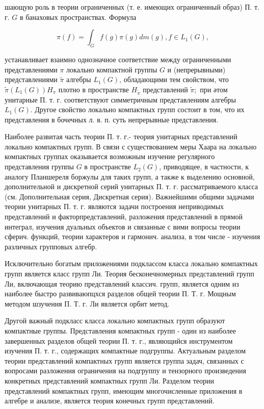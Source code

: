 \documentclass[10pt]{article}
\begin{document}
шающую роль в теории ограниченных (т. е. имеющих ограниченный образ) П. т. г. $G$ в банаховых пространствах. Формула



\[

\pi(f)=\int_{G} f(g) \pi(g) d m(g), f \in L_{1}(G),

\]



устанавливает взаимно однозначное соответствие между ограниченными представлениями $\pi$ локально компактной группы $G$ и (непрерывными) представлениями $\tilde{\pi}$ алгебры $L_{1}(G)$, обладающими тем свойством, что $\tilde{\pi}\left(L_{1}(G)\right) H_{\pi}$ плотно в пространстве $H_{\tilde{\pi}}$ представлений $\tilde{\pi} ;$ при әтом унитарные П. т. г. соответствуют симметричным представлениям алгебры $L_{1}(G)$. Другое свойство локально компактных групп состоит в том, что их представления в бочечных л. в. п. суть непрерывные представления.



Наиболее развитая часть теории П. т. г.- теория унитарных представлений локально компактных групп. В связи с существованием меры Хаара на локально компактных группах оказывается возможным изучение регулярного представления группы $G$ в пространстве $L_{2}(G)$, приводящее, в частности, к аналогу Планшереля боржулы для таких групп, а также к выделению основной, дополнительной и дискретной серий унитарных П. т. г. рассматриваемого класса (см. Дополнительная серия, Дискретная серия). Важнейшими общими задачами теории унитарных П. т. г. являются задачи построения неприводимых представлений и факторпредставлений, разложения представлений в прямой интеграл, изучения дуальных объектов и связанные с вими вопросы теории сферич. функций, теории характеров и гармонич. анализа, в том числе - изучения различных групповых алгебр.



Исключительно богатым приложениями подклассом класса локально компактных групп является класс групп Ли. Теория бесконечномерных представлений групп Ли, включающая теорию представлений классич. групп, является одним из наиболее быстро развиваюпцхся разделов общей теории П. Т. г. Мощным методом шзучения П. Т. г. Ли является орбит метод.



Другой важный подкласс класса локально компактных групп образуют компактные группы. Представления компактных групп - один из наиболее завершенных разделов общей теории П. т. г., являющийся инструментом изучения П. т. г., содержащих компактные подгруппы. Актуальным разделом теории представлений компактных групп является группа задач, связанных с вопросами разложения ограничения на подгруппу и тензорного произведения конкретных представлений компактных групп Ли. Разделом теории представлений компактных групп, имеющим многочисленные приложения в алгебре и анализе, является теория конечных групп представлений.
\end{document}
